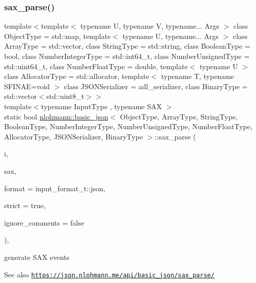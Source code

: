 \subsubsection{\texorpdfstring{sax\+\_\+parse()}{sax\_parse()}\hspace{0.1cm}{\footnotesize\ttfamily [1/3]}}
{\footnotesize\ttfamily template$<$template$<$ typename U, typename V, typename... Args $>$ class Object\+Type = std\+::map, template$<$ typename U, typename... Args $>$ class Array\+Type = std\+::vector, class String\+Type  = std\+::string, class Boolean\+Type  = bool, class Number\+Integer\+Type  = std\+::int64\+\_\+t, class Number\+Unsigned\+Type  = std\+::uint64\+\_\+t, class Number\+Float\+Type  = double, template$<$ typename U $>$ class Allocator\+Type = std\+::allocator, template$<$ typename T, typename S\+F\+I\+N\+A\+E=void $>$ class J\+S\+O\+N\+Serializer = adl\+\_\+serializer, class Binary\+Type  = std\+::vector$<$std\+::uint8\+\_\+t$>$$>$ \\
template$<$typename Input\+Type , typename S\+AX $>$ \\
static bool \hyperlink{classnlohmann_1_1basic__json}{nlohmann\+::basic\+\_\+json}$<$ Object\+Type, Array\+Type, String\+Type, Boolean\+Type, Number\+Integer\+Type, Number\+Unsigned\+Type, Number\+Float\+Type, Allocator\+Type, J\+S\+O\+N\+Serializer, Binary\+Type $>$\+::sax\+\_\+parse (\begin{DoxyParamCaption}\item[{Input\+Type \&\&}]{i,  }\item[{S\+AX $\ast$}]{sax,  }\item[{\hyperlink{namespacenlohmann_1_1detail_aa554fc6a11519e4f347deb25a9f0db40}{input\+\_\+format\+\_\+t}}]{format = {\ttfamily input\+\_\+format\+\_\+t\+:\+:json},  }\item[{const bool}]{strict = {\ttfamily true},  }\item[{const bool}]{ignore\+\_\+comments = {\ttfamily false} }\end{DoxyParamCaption})\hspace{0.3cm}{\ttfamily [inline]}, {\ttfamily [static]}}



generate S\+AX events 

\begin{DoxySeeAlso}{See also}
\href{https://json.nlohmann.me/api/basic_json/sax_parse/}{\tt https\+://json.\+nlohmann.\+me/api/basic\+\_\+json/sax\+\_\+parse/} 
\end{DoxySeeAlso}
\mbox{\label{classnlohmann_1_1basic__json_ab62241c2694a054818edf2f66d72f113}} 
